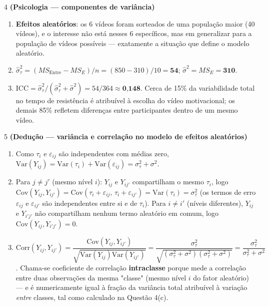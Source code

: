 \documentclass[11pt]{article}
\begin{document}
\begin{questao}{4} \textbf{(Psicologia --- componentes de variância)}
\end{questao}
\begin{solucao}
\begin{enumerate}[label=(\alph*)]
  \item \textbf{Efeitos aleatórios}: os 6 vídeos foram sorteados de uma população maior (40
    vídeos), e o interesse não está nesses 6 específicos, mas em generalizar para a população de
    vídeos possíveis --- exatamente a situação que define o modelo aleatório.
  \item $\hat\sigma_\tau^2 = (MS_{\text{Entre}}-MS_E)/n = (850-310)/10 = \textbf{54}$;
    $\hat\sigma^2 = MS_E = \textbf{310}$.
  \item $\mathrm{ICC} = \hat\sigma_\tau^2/(\hat\sigma_\tau^2+\hat\sigma^2) = 54/364 \approx
    \textbf{0{,}148}$. Cerca de 15\% da variabilidade total no tempo de resistência é atribuível à
    escolha do vídeo motivacional; os demais 85\% refletem diferenças entre participantes dentro
    de um mesmo vídeo.
\end{enumerate}
\end{solucao}

\begin{questao}{5} \textbf{(Dedução --- variância e correlação no modelo de efeitos aleatórios)}
\end{questao}
\begin{solucao}
\begin{enumerate}[label=(\alph*)]
  \item Como $\tau_i$ e $\varepsilon_{ij}$ são independentes com médias zero,
    $\mathrm{Var}(Y_{ij}) = \mathrm{Var}(\tau_i) + \mathrm{Var}(\varepsilon_{ij}) = \sigma_\tau^2 +
    \sigma^2$.
  \item Para $j\neq j'$ (mesmo nível $i$): $Y_{ij}$ e $Y_{ij'}$ compartilham o mesmo $\tau_i$, logo
    $\mathrm{Cov}(Y_{ij},Y_{ij'}) = \mathrm{Cov}(\tau_i+\varepsilon_{ij},\,\tau_i+\varepsilon_{ij'})
    = \mathrm{Var}(\tau_i) = \sigma_\tau^2$ (os termos de erro $\varepsilon_{ij}$ e
    $\varepsilon_{ij'}$ são independentes entre si e de $\tau_i$). Para $i\neq i'$ (níveis
    diferentes), $Y_{ij}$ e $Y_{i'j'}$ não compartilham nenhum termo aleatório em comum, logo
    $\mathrm{Cov}(Y_{ij},Y_{i'j'}) = 0$.
  \item $\mathrm{Corr}(Y_{ij},Y_{ij'}) = \dfrac{\mathrm{Cov}(Y_{ij},Y_{ij'})}
    {\sqrt{\mathrm{Var}(Y_{ij})\mathrm{Var}(Y_{ij'})}} = \dfrac{\sigma_\tau^2}
    {\sqrt{(\sigma_\tau^2+\sigma^2)(\sigma_\tau^2+\sigma^2)}} =
    \dfrac{\sigma_\tau^2}{\sigma_\tau^2+\sigma^2}$. Chama-se coeficiente de correlação
    \textbf{intraclasse} porque mede a correlação entre duas observações da mesma "classe"
    (mesmo nível $i$ do fator aleatório) --- e é numericamente igual à fração da variância total
    atribuível à variação \emph{entre} classes, tal como calculado na Questão 4(c).
\end{enumerate}
\end{solucao}
\end{document}
